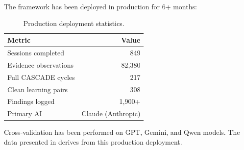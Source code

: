 The framework has been deployed in production for 6+ months:

\begin{table}[h]
\centering
\begin{tabular}{lr}
\toprule
\textbf{Metric} & \textbf{Value} \\
\midrule
Sessions completed & 849 \\
Evidence observations & 82,380 \\
Full CASCADE cycles & 217 \\
Clean learning pairs & 308 \\
Findings logged & 1,900+ \\
Primary AI & Claude (Anthropic) \\
\bottomrule
\end{tabular}
\caption{Production deployment statistics.}
\label{tab:deployment-stats}
\end{table}

Cross-validation has been performed on GPT, Gemini, and Qwen models. The data presented in  derives from this production deployment.
